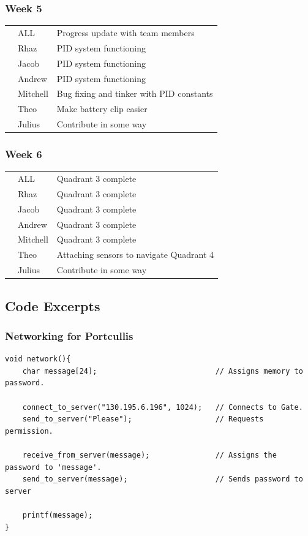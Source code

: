 \documentclass[paper=a4, fontsize=11pt]{scrartcl} %
\def\checkmark{\tikz\fill[scale=0.4] (0,.35) -- (.25,0) -- (1,.7) -- (.25,.15) -- cycle;}
\def\scalecheck{\resizebox{\widthof{\checkmark}*\ratio{\widthof{x}}{\widthof{\normalsize x}}}{!}{\checkmark}}
\numberwithin{equation}{section} %
\numberwithin{figure}{section} %
\begin{document}
\subsubsection*{Week 5}
\begin{tabularx}{\textwidth}{clX}
  \scalecheck & ALL      & Progress update with team members\\
  \scalecheck & Rhaz     & PID system functioning\\
  \scalecheck & Jacob    & PID system functioning\\
  \scalecheck & Andrew   & PID system functioning\\
  \scalecheck & Mitchell & Bug fixing and tinker with PID constants\\
  \scalecheck & Theo     & Make battery clip easier\\
              & Julius   & Contribute in some way\\
\end{tabularx}
\subsubsection*{Week 6}
\begin{tabularx}{\textwidth}{clX}
              & ALL      & Quadrant 3 complete\\
              & Rhaz     & Quadrant 3 complete\\
              & Jacob    & Quadrant 3 complete\\ 
              & Andrew   & Quadrant 3 complete\\ 
              & Mitchell & Quadrant 3 complete\\ 
  \scalecheck & Theo     & Attaching sensors to navigate Quadrant 4\\
              & Julius   & Contribute in some way\\
\end{tabularx}
\subsection{Code Excerpts}
\subsubsection{Networking for Portcullis}
\begin{verbatim}
void network(){
	char message[24];							// Assigns memory to password.

	connect_to_server("130.195.6.196", 1024);	// Connects to Gate.
	send_to_server("Please");					// Requests permission.

	receive_from_server(message);				// Assigns the password to 'message'.
	send_to_server(message);					// Sends password to server

	printf(message);
}
\end{verbatim}
\end{document}
